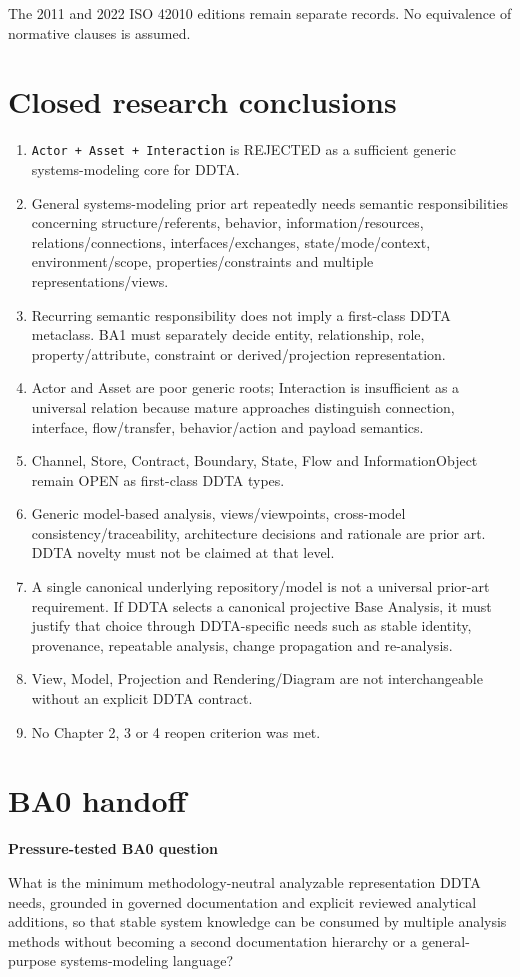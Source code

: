 \documentclass[10pt,a4paper]{article}
\newenvironment{challenge}[1]{\def\FrameCommand{\fcolorbox{ddtaorange}{ddtagray}}\MakeFramed{\advance\hsize-2\width\FrameRestore}\noindent\textbf{#1}\par\smallskip}{\endMakeFramed}
\begin{document}
The 2011 and 2022 ISO 42010 editions remain separate records. No equivalence of normative clauses is assumed.

\section{Closed research conclusions}
\begin{enumerate}
\item \texttt{Actor + Asset + Interaction} is REJECTED as a sufficient generic systems-modeling core for DDTA.
\item General systems-modeling prior art repeatedly needs semantic responsibilities concerning structure/referents, behavior, information/resources, relations/connections, interfaces/exchanges, state/mode/context, environment/scope, properties/constraints and multiple representations/views.
\item Recurring semantic responsibility does not imply a first-class DDTA metaclass. BA1 must separately decide entity, relationship, role, property/attribute, constraint or derived/projection representation.
\item Actor and Asset are poor generic roots; Interaction is insufficient as a universal relation because mature approaches distinguish connection, interface, flow/transfer, behavior/action and payload semantics.
\item Channel, Store, Contract, Boundary, State, Flow and InformationObject remain OPEN as first-class DDTA types.
\item Generic model-based analysis, views/viewpoints, cross-model consistency/traceability, architecture decisions and rationale are prior art. DDTA novelty must not be claimed at that level.
\item A single canonical underlying repository/model is not a universal prior-art requirement. If DDTA selects a canonical projective Base Analysis, it must justify that choice through DDTA-specific needs such as stable identity, provenance, repeatable analysis, change propagation and re-analysis.
\item View, Model, Projection and Rendering/Diagram are not interchangeable without an explicit DDTA contract.
\item No Chapter 2, 3 or 4 reopen criterion was met.
\end{enumerate}

\section{BA0 handoff}
\begin{challenge}{Pressure-tested BA0 question}
What is the minimum methodology-neutral analyzable representation DDTA needs, grounded in governed documentation and explicit reviewed analytical additions, so that stable system knowledge can be consumed by multiple analysis methods without becoming a second documentation hierarchy or a general-purpose systems-modeling language?
\end{challenge}
\end{document}
